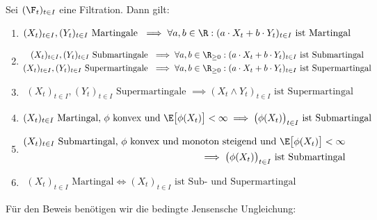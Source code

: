 \begin{proposition}\label{Prop2.1}\enter
Sei $(\F_t)_{t\in I}$ eine Filtration. Dann gilt:
\begin{enumerate}[label=\alph*)]
\item $\begin{aligned}
(X_t)_{t\in I},(Y_t)_{t\in I}\text{ Martingale }
\implies\forall a,b\in\R: (a\cdot X_t+b\cdot Y_t)_{t\in I}\text{ ist Martingal}
\end{aligned}$
\item $\begin{aligned}
(X_t)_{t\in I},(Y_t)_{t\in I}\text{ Submartingale }
&\implies\forall a,b\in\R_{\geq0}: (a\cdot X_t+b\cdot Y_t)_{t\in I}\text{ ist Submartingal}\\
(X_t)_{t\in I},(Y_t)_{t\in I}\text{ Supermartingale }
&\implies\forall a,b\in\R_{\geq0}: (a\cdot X_t+b\cdot Y_t)_{t\in I}\text{ ist Supermartingal}
\end{aligned}$
\item $\begin{aligned}
(X_t)_{t\in I},(Y_t)_{t\in I}\text{ Supermartingale }
\implies (X_t\wedge Y_t)_{t\in I}\text{ ist Supermartingal}
\end{aligned}$
\item $\begin{aligned}
(X_t)_{t\in I}\text{ Martingal, $\phi$ konvex und }\E\big[\phi(X_t)\big]<\infty
\implies \big(\phi(X_t)\big)_{t\in I}\text{ ist Submartingal}
\end{aligned}$
\item $\begin{aligned}
(X_t)_{t\in I}\text{ Submartingal, $\phi$ konvex und monoton steigend und }\E\big[\phi(X_t)\big]<\infty\\
\implies \big(\phi(X_t)\big)_{t\in I}\text{ ist Submartingal}
\end{aligned}$
\item $\begin{aligned}
(X_t)_{t\in I}\text{ Martingal}
\Longleftrightarrow
(X_t)_{t\in I}\text{ ist Sub- und Supermartingal}
\end{aligned}$
\end{enumerate}
\end{proposition}

Für den Beweis benötigen wir die bedingte Jensensche Ungleichung:

